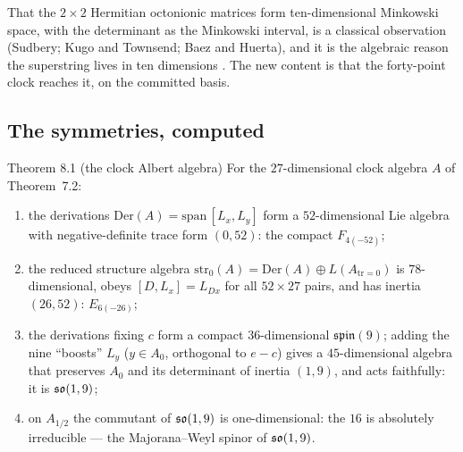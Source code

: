 That the $2\times2$ Hermitian octonionic matrices form ten-dimensional Minkowski space, with
the determinant as the Minkowski interval, is a classical observation (Sudbery; Kugo and
Townsend; Baez and Huerta), and it is the algebraic reason the superstring lives in ten
dimensions \cite{BaezHuerta,KugoTownsend}. The new content is that the forty-point clock
reaches it, on the committed basis.

\subsection{The symmetries, computed}

\begin{result}{Theorem 8.1 (the clock Albert algebra) \hfill \tierC}
For the $27$-dimensional clock algebra $A$ of Theorem~7.2:
\begin{enumerate}[label=(\roman*),leftmargin=1.5em]
\item the derivations $\mathrm{Der}(A)=\mathrm{span}\,[L_x,L_y]$ form a $52$-dimensional
      Lie algebra with negative-definite trace form $(0,52)$: the compact $F_{4(-52)}$;
\item the reduced structure algebra $\mathrm{str}_0(A)=\mathrm{Der}(A)\oplus L(A_{\mathrm{tr}=0})$
      is $78$-dimensional, obeys $[D,L_x]=L_{Dx}$ for all $52\times27$ pairs, and has
      inertia $(26,52)$: $E_{6(-26)}$;
\item the derivations fixing $c$ form a compact $36$-dimensional $\mathfrak{spin}(9)$;
      adding the nine ``boosts'' $L_y$ ($y\in A_0$, orthogonal to $e-c$) gives a
      $45$-dimensional algebra that preserves $A_0$ and its determinant of inertia $(1,9)$,
      and acts faithfully: it is $\mathfrak{so}(1,9)$;
\item on $A_{1/2}$ the commutant of $\mathfrak{so}(1,9)$ is one-dimensional: the $16$ is absolutely
      irreducible --- the Majorana--Weyl spinor of $\mathfrak{so}(1,9)$.
\end{enumerate}
\end{result}

